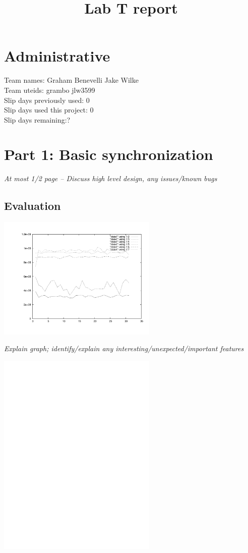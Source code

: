 \documentclass[11pt, letterpaper]{article}
\title{Lab T report}
\begin{document}
\maketitle
\section{Administrative}

Team names: Graham Benevelli Jake Wilke\\
Team uteids: grambo jlw3599\\
Slip days previously used: 0\\
Slip days used this project: 0\\
Slip days remaining:?\\

\section{Part 1: Basic synchronization}

{\em At most 1/2 page -- Discuss high level design, any issues/known
  bugs}

\subsection{Evaluation}

\centerline{\includegraphics[width=3in]{plot1}}

{\em Explain graph; identify/explain any
  interesting/unexpected/important features}


\centerline{\includegraphics[width=3in]{plot1b}}
\end{document}

